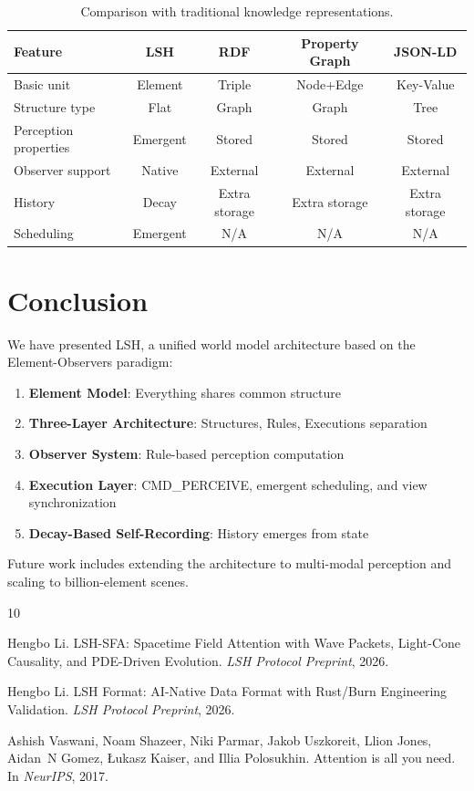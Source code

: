 \documentclass{article}
\begin{document}
\begin{table}[h]
\centering
\caption{Comparison with traditional knowledge representations.}
\label{tab:comparison}
\begin{tabular}{lcccc}
\toprule
\textbf{Feature} & \textbf{LSH} & \textbf{RDF} & \textbf{Property Graph} & \textbf{JSON-LD} \\
\midrule
Basic unit & Element & Triple & Node+Edge & Key-Value \\
Structure type & Flat & Graph & Graph & Tree \\
Perception properties & Emergent & Stored & Stored & Stored \\
Observer support & Native & External & External & External \\
History & Decay & Extra storage & Extra storage & Extra storage \\
Scheduling & Emergent & N/A & N/A & N/A \\
\bottomrule
\end{tabular}
\end{table}

\section{Conclusion}

We have presented LSH, a unified world model architecture based on the Element-Observers paradigm:

\begin{enumerate}
\item \textbf{Element Model}: Everything shares common structure
\item \textbf{Three-Layer Architecture}: Structures, Rules, Executions separation
\item \textbf{Observer System}: Rule-based perception computation
\item \textbf{Execution Layer}: CMD\_PERCEIVE, emergent scheduling, and view synchronization
\item \textbf{Decay-Based Self-Recording}: History emerges from state
\end{enumerate}

Future work includes extending the architecture to multi-modal perception and scaling to billion-element scenes.


\begin{thebibliography}{10}

Hengbo Li.
\newblock LSH-SFA: Spacetime Field Attention with Wave Packets, Light-Cone Causality, and PDE-Driven Evolution.
\newblock \emph{LSH Protocol Preprint}, 2026.

Hengbo Li.
\newblock LSH Format: AI-Native Data Format with Rust/Burn Engineering Validation.
\newblock \emph{LSH Protocol Preprint}, 2026.

Ashish Vaswani, Noam Shazeer, Niki Parmar, Jakob Uszkoreit, Llion Jones, Aidan~N Gomez, {\L}ukasz Kaiser, and Illia Polosukhin.
\newblock Attention is all you need.
\newblock In \emph{NeurIPS}, 2017.

\end{thebibliography}
\end{document}
